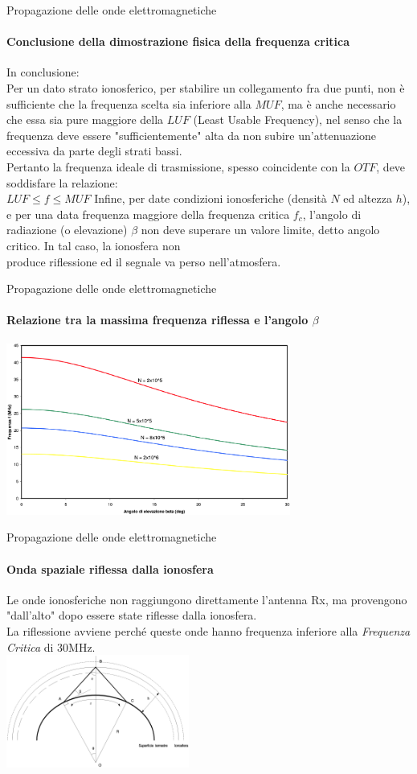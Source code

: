 \documentclass[aspectratio=169]{beamer}
\newcommand*{\vet}{\fontfamily{qzc}\selectfont}
\begin{document}
\begin{frame}{Propagazione delle onde elettromagnetiche}
	\framesubtitle{Conclusione della dimostrazione fisica della frequenza critica }
	In conclusione:\\
	\smallskip
	Per un dato strato ionosferico, per stabilire un collegamento fra due punti, non è sufficiente che la frequenza scelta sia inferiore alla $MUF$, ma è anche necessario che essa sia pure maggiore della $LUF$ (Least Usable Frequency), nel senso che la frequenza deve essere "sufficientemente" alta da non subire un'attenuazione eccessiva da parte degli strati bassi.\\
	Pertanto la frequenza ideale di trasmissione, spesso coincidente con la $OTF$, deve soddisfare la relazione:\\
	\smallskip
	$LUF \leq f \leq MUF$
	\smallskip
	Infine, per date condizioni ionosferiche (densità $N$ ed altezza $h$), e per una data frequenza maggiore della frequenza critica $f_{c}$, l'angolo di radiazione (o elevazione) $\beta$ non deve superare un valore limite, detto angolo critico. In tal caso, la ionosfera non\\ produce riflessione ed il segnale va perso nell'atmosfera.
\end{frame}

\begin{frame}{Propagazione delle onde elettromagnetiche}
	\framesubtitle{Relazione tra la massima frequenza riflessa e l'angolo $\beta$}
	\centering
	 \includegraphics[width=0.7\textwidth]{Imgs/Beta}
\end{frame}

\begin{frame}{Propagazione delle onde elettromagnetiche}
	\framesubtitle{Onda spaziale riflessa dalla ionosfera}
	Le onde ionosferiche non raggiungono direttamente l'antenna {\vet Rx}, ma provengono "dall'alto" dopo essere state riflesse dalla ionosfera.\\
	La riflessione avviene perché queste onde hanno frequenza inferiore alla \emph{Frequenza Critica} di 30MHz.\\
	\medskip
	\centering
	 \includegraphics[width=0.45\textwidth]{Imgs/Ionosfera}
	\end{frame}
\end{document}
